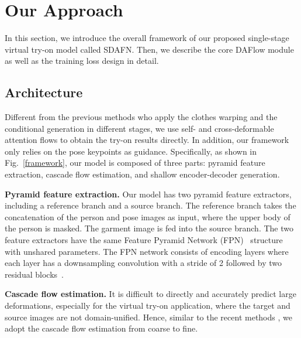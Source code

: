 \documentclass[runningheads]{llncs}
\begin{document}
\section{Our Approach}

In this section, we introduce the overall framework of our proposed single-stage virtual try-on model called SDAFN. Then, we describe the core DAFlow module as well as the training loss design in detail. 

\begin{figure}[t]
\end{figure}

\subsection{Architecture\label{sec:arc}}
Different from the previous methods who apply the clothes warping and the conditional generation in different stages, we use self- and cross-deformable attention flows to obtain the try-on results directly. In addition, our framework only relies on the pose keypoints as guidance. Specifically, as shown in Fig.~\ref{framework}, our model is composed of three parts: pyramid feature extraction, cascade flow estimation, and shallow encoder-decoder generation.

\textbf{Pyramid feature extraction.} 
Our model has two pyramid feature extractors, including a reference branch and a source branch. The reference branch takes the concatenation of the person and pose images as input, where the upper body of the person is masked. The garment image is fed into the source branch. The two feature extractors have the same Feature Pyramid Network (FPN)~\cite{fpn} structure with unshared parameters. The FPN network consists of  encoding layers where each layer has a downsampling convolution with a stride of 2 followed by two residual blocks~\cite{resnet}. 

\textbf{Cascade flow estimation.} It is difficult to directly and accurately predict large deformations, especially for the virtual try-on application, where the target and source images are not domain-unified. Hence, similar to the recent methods \cite{han2019clothflow,ge2021parser}, we adopt the cascade flow estimation from coarse to fine.
\end{document}
